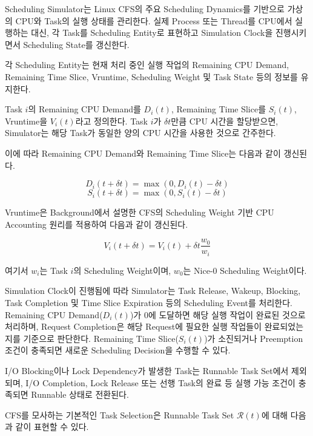 Scheduling Simulator는 Linux CFS의 주요 Scheduling
Dynamics를 기반으로 가상의 CPU와 Task의 실행 상태를
관리한다.
실제 Process 또는 Thread를 CPU에서 실행하는 대신,
각 Task를 Scheduling Entity로 표현하고 Simulation Clock을
진행시키면서 Scheduling State를 갱신한다.

각 Scheduling Entity는 현재 처리 중인 실행 작업의 Remaining CPU Demand,
Remaining Time Slice, Vruntime, Scheduling Weight
및 Task State 등의 정보를 유지한다.

Task $i$의 Remaining CPU Demand를 $D_i(t)$,
Remaining Time Slice를 $S_i(t)$,
Vruntime을 $V_i(t)$라고 정의한다.
Task $i$가 $\delta t$만큼 CPU 시간을 할당받으면,
Simulator는 해당 Task가 동일한 양의 CPU 시간을
사용한 것으로 간주한다.

이에 따라 Remaining CPU Demand와 Remaining Time Slice는
다음과 같이 갱신된다.

\begin{equation}
    D_i(t+\delta t)
    =
    \max(0,D_i(t)-\delta t)
\end{equation}
\begin{equation}
    S_i(t+\delta t)
    =
    \max(0,S_i(t)-\delta t)
\end{equation}

Vruntime은 Background에서 설명한 CFS의
Scheduling Weight 기반 CPU Accounting 원리를 적용하여
다음과 같이 갱신된다.

\begin{equation}
    V_i(t+\delta t) = V_i(t)+\delta t\frac{w_0}{w_i}
\end{equation}

여기서 $w_i$는 Task $i$의 Scheduling Weight이며, $w_0$는 Nice-0 Scheduling Weight이다.

Simulation Clock이 진행됨에 따라 Simulator는
Task Release, Wakeup, Blocking, Task Completion 및
Time Slice Expiration 등의 Scheduling Event를 처리한다.
Remaining CPU Demand($D_i(t)$)가 0에 도달하면 해당 실행 작업이
완료된 것으로 처리하며, Request Completion은 해당 Request에
필요한 실행 작업들이 완료되었는지를 기준으로 판단한다.
Remaining Time Slice($S_i(t)$)가 소진되거나
Preemption 조건이 충족되면 새로운 Scheduling Decision을
수행할 수 있다.

I/O Blocking이나 Lock Dependency가 발생한 Task는
Runnable Task Set에서 제외되며,
I/O Completion, Lock Release 또는 선행 Task의 완료 등
실행 가능 조건이 충족되면 Runnable 상태로 전환된다.

CFS를 모사하는 기본적인 Task Selection은
Runnable Task Set $\mathcal{R}(t)$에 대해 다음과 같이
표현할 수 있다.


